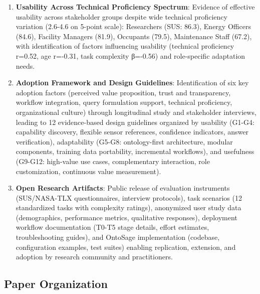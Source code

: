 \documentclass[acmlarge]{acmart}
\begin{document}
\begin{enumerate}
    \item \textbf{Usability Across Technical Proficiency Spectrum}: Evidence of effective usability across stakeholder groups despite wide technical proficiency variation (2.6-4.6 on 5-point scale): Researchers (SUS: 86.3), Energy Officers (84.6), Facility Managers (81.9), Occupants (79.5), Maintenance Staff (67.2), with identification of factors influencing usability (technical proficiency r=0.52, age r=-0.31, task complexity β=-0.56) and role-specific adaptation needs.
    
    \item \textbf{Adoption Framework and Design Guidelines}: Identification of six key adoption factors (perceived value proposition, trust and transparency, workflow integration, query formulation support, technical proficiency, organizational culture) through longitudinal study and stakeholder interviews, leading to 12 evidence-based design guidelines organized by usability (G1-G4: capability discovery, flexible sensor references, confidence indicators, answer verification), adaptability (G5-G8: ontology-first architecture, modular components, training data portability, incremental workflows), and usefulness (G9-G12: high-value use cases, complementary interaction, role customization, continuous value measurement).
    
    \item \textbf{Open Research Artifacts}: Public release of evaluation instruments (SUS/NASA-TLX questionnaires, interview protocols), task scenarios (12 standardized tasks with complexity ratings), anonymized user study data (demographics, performance metrics, qualitative responses), deployment workflow documentation (T0-T5 stage details, effort estimates, troubleshooting guides), and OntoSage implementation (codebase, configuration examples, test suites) enabling replication, extension, and adoption by research community and practitioners.
\end{enumerate}

\subsection{Paper Organization}
\end{document}
